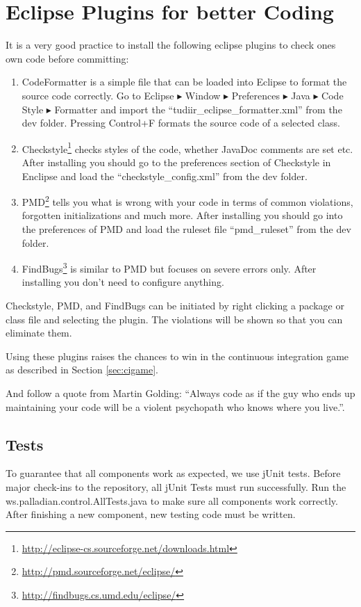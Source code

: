 \section{Eclipse Plugins for better Coding}
\label{sec:eclipseCodingPlugins}
It is a very good practice to install the following eclipse plugins to check ones own code before committing:
\begin{enumerate}
\item CodeFormatter is a simple file that can be loaded into Eclipse to format the source code correctly. Go to Eclipse $\blacktriangleright$ Window $\blacktriangleright$ Preferences $\blacktriangleright$ Java $\blacktriangleright$ Code Style $\blacktriangleright$ Formatter and import the ``tudiir\_eclipse\_formatter.xml'' from the dev folder. Pressing Control+F formats the source code of a selected class.
\item Checkstyle\footnote{\url{http://eclipse-cs.sourceforge.net/downloads.html}} checks styles of the code, whether JavaDoc comments are set etc. After installing you should go to the preferences section of Checkstyle in Enclipse and load the ``checkstyle\_config.xml'' from the dev folder.
\item PMD\footnote{\url{http://pmd.sourceforge.net/eclipse/}} tells you what is wrong with your code in terms of common violations, forgotten initializations and much more. After installing you should go into the preferences of PMD and load the ruleset file ``pmd\_ruleset'' from the dev folder.
\item FindBugs\footnote{\url{http://findbugs.cs.umd.edu/eclipse/}} is similar to PMD but focuses on severe errors only. After installing you don't need to configure anything.
\end{enumerate}

Checkstyle, PMD, and FindBugs can be initiated by right clicking a package or class file and selecting the plugin. The violations will be shown so that you can eliminate them.

Using these plugins raises the chances to win in the continuous integration game as described in Section \ref{sec:cigame}.

And follow a quote from Martin Golding: ``Always code as if the guy who ends up maintaining your code will be a violent psychopath who knows where you live.''.

\subsection{Tests}
To guarantee that all components work as expected, we use jUnit tests. Before major check-ins to the repository, all jUnit Tests must run successfully. Run the ws.palladian.control.AllTests.java to make sure all components work correctly.
After finishing a new component, new testing code must be written.

